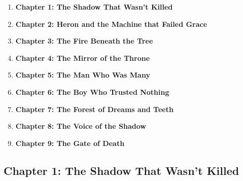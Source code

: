 \documentclass[9pt]{article}
\begin{document}
\begin{enumerate}
    \item \textbf{Chapter 1: The Shadow That Wasn’t Killed} 

    \vspace{1em}
    \item \textbf{Chapter 2: Heron and the Machine that Failed Grace} 

    \vspace{1em}
    \item \textbf{Chapter 3: The Fire Beneath the Tree} 

    \vspace{1em}
    \item \textbf{Chapter 4: The Mirror of the Throne} 

    \vspace{1em}
    \item \textbf{Chapter 5: The Man Who Was Many} 

    \vspace{1em}
    \item \textbf{Chapter 6: The Boy Who Trusted Nothing}

    \vspace{1em}
    \item \textbf{Chapter 7: The Forest of Dreams and Teeth} 

    \vspace{1em}
    \item \textbf{Chapter 8: The Voice of the Shadow}

    \vspace{1em}
    \item \textbf{Chapter 9: The Gate of Death}

\end{enumerate}

\newpage

\subsection*{Chapter 1: The Shadow That Wasn’t Killed}

\vspace{1in}
\end{document}
